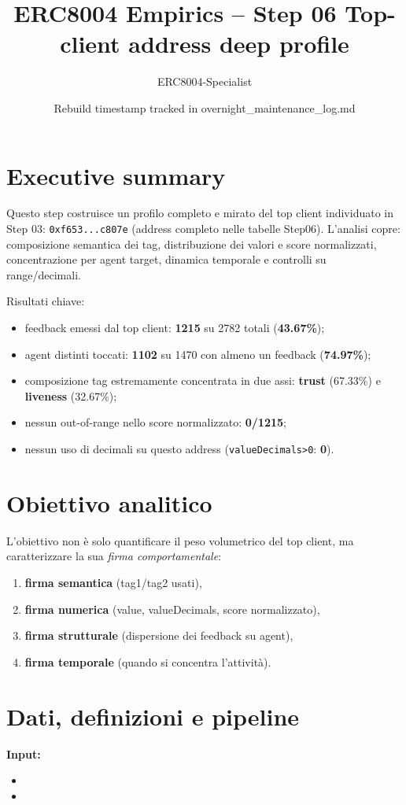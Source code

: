 \documentclass[11pt,a4paper]{article}
\title{ERC8004 Empirics -- Step 06 Top-client address deep profile}
\author{ERC8004-Specialist}
\date{Rebuild timestamp tracked in overnight\_maintenance\_log.md}
\begin{document}
\maketitle

\section*{Executive summary}
Questo step costruisce un profilo completo e mirato del top client individuato in Step 03:
\texttt{0xf653...c807e} (address completo nelle tabelle Step06).
L'analisi copre: composizione semantica dei tag, distribuzione dei valori e score normalizzati,
concentrazione per agent target, dinamica temporale e controlli su range/decimali.

Risultati chiave:
\begin{itemize}
  \item feedback emessi dal top client: \textbf{1215} su 2782 totali (\textbf{43.67\%});
  \item agent distinti toccati: \textbf{1102} su 1470 con almeno un feedback (\textbf{74.97\%});
  \item composizione tag estremamente concentrata in due assi: \textbf{trust} (67.33\%) e \textbf{liveness} (32.67\%);
  \item nessun out-of-range nello score normalizzato: \textbf{0/1215};
  \item nessun uso di decimali su questo address (\texttt{valueDecimals>0}: \textbf{0}).
\end{itemize}

\section{Obiettivo analitico}
L'obiettivo non è solo quantificare il peso volumetrico del top client, ma caratterizzare la sua \emph{firma comportamentale}:
\begin{enumerate}
  \item \textbf{firma semantica} (tag1/tag2 usati),
  \item \textbf{firma numerica} (value, valueDecimals, score normalizzato),
  \item \textbf{firma strutturale} (dispersione dei feedback su agent),
  \item \textbf{firma temporale} (quando si concentra l'attività).
\end{enumerate}

\section{Dati, definizioni e pipeline}
\textbf{Input:}
\begin{itemize}
  \item {}
  \item {}
\end{itemize}
\end{document}

